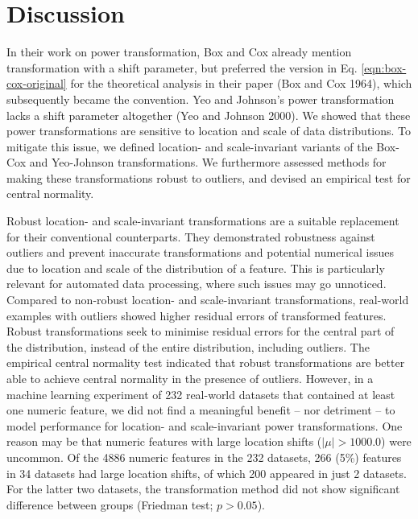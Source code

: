 \documentclass[preprint,12pt,authoryear]{elsarticle}
\begin{document}
\section{Discussion}\label{discussion}

In their work on power transformation, Box and Cox already mention
transformation with a shift parameter, but preferred the version in Eq.
\ref{eqn:box-cox-original} for the theoretical analysis in their paper
(Box and Cox 1964), which subsequently became the convention. Yeo and
Johnson's power transformation lacks a shift parameter altogether (Yeo
and Johnson 2000). We showed that these power transformations are
sensitive to location and scale of data distributions. To mitigate this
issue, we defined location- and scale-invariant variants of the Box-Cox
and Yeo-Johnson transformations. We furthermore assessed methods for
making these transformations robust to outliers, and devised an
empirical test for central normality.

Robust location- and scale-invariant transformations are a suitable
replacement for their conventional counterparts. They demonstrated
robustness against outliers and prevent inaccurate transformations and
potential numerical issues due to location and scale of the distribution
of a feature. This is particularly relevant for automated data
processing, where such issues may go unnoticed. Compared to non-robust
location- and scale-invariant transformations, real-world examples with
outliers showed higher residual errors of transformed features. Robust
transformations seek to minimise residual errors for the central part of
the distribution, instead of the entire distribution, including
outliers. The empirical central normality test indicated that robust
transformations are better able to achieve central normality in the
presence of outliers. However, in a machine learning experiment of 232
real-world datasets that contained at least one numeric feature, we did
not find a meaningful benefit -- nor detriment -- to model performance
for location- and scale-invariant power transformations. One reason may
be that numeric features with large location shifts (\(|\mu| > 1000.0\))
were uncommon. Of the 4886 numeric features in the 232 datasets, 266
(5\%) features in 34 datasets had large location shifts, of which 200
appeared in just 2 datasets. For the latter two datasets, the
transformation method did not show significant difference between groups
(Friedman test; \(p > 0.05\)).
\end{document}
